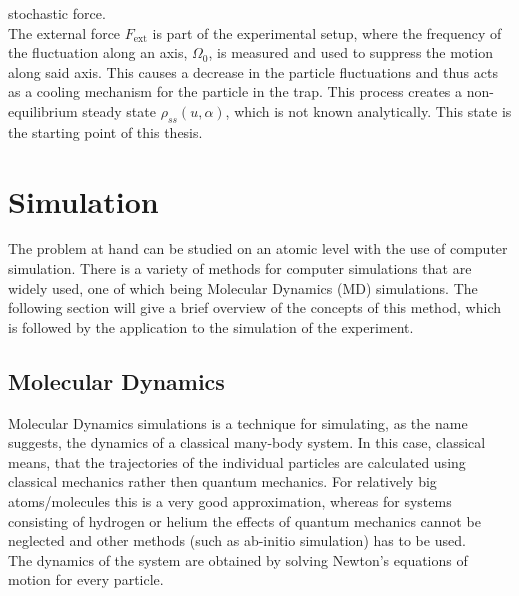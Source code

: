 \documentclass[12pt]{article}
\begin{document}
stochastic force.\\
The external force $F_\text{ext}$ is part of the experimental setup, where the frequency of the fluctuation along an axis, $\Omega_0$, is measured and
used to suppress the motion along said axis. This causes a decrease in the particle fluctuations and thus acts as a cooling mechanism for the particle
in the trap. This process creates a non-equilibrium steady state $\rho_{ss}(u,\alpha)$, which is not known analytically. This state is the starting
point of this thesis.\\








\newpage
\section{Simulation}
The problem at hand can be studied on an atomic level with the use of computer simulation. There is a variety of methods for computer simulations
that are widely used, one of which being Molecular Dynamics (MD) simulations. The following section will give a brief overview of the concepts of this
method, which is followed by the application to the simulation of the experiment.

\subsection{Molecular Dynamics}
Molecular Dynamics\cite{Frenkel2001} simulations is a technique for simulating, as the name suggests, the dynamics of a classical many-body system. In this case,
classical means, that the trajectories of the individual particles are calculated using classical mechanics rather then quantum mechanics. For
relatively big atoms/molecules this is a very good approximation, whereas for systems consisting of hydrogen or helium the effects of quantum
mechanics cannot be neglected and other methods (such as ab-initio simulation) has to be used.\\
The dynamics of the system are obtained by solving Newton's equations of motion for every particle. 
\end{document}
